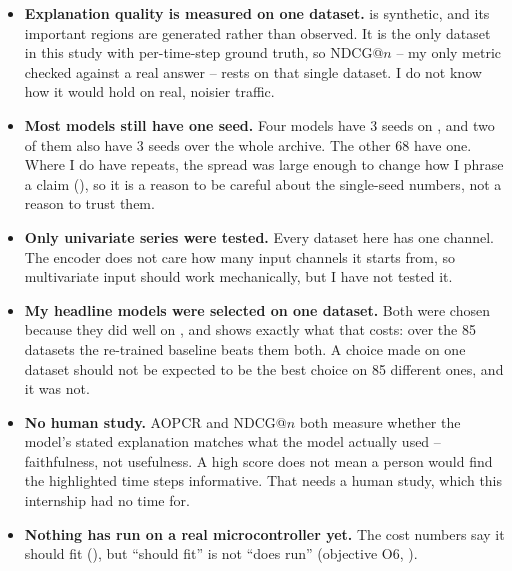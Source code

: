 \begin{itemize}\itemsep3pt
  \item \textbf{Explanation quality is measured on one dataset.} \webtraffic{} is synthetic, and
        its important regions are generated rather than observed. It is the only dataset in this
        study with per-time-step ground truth, so NDCG@$n$ -- my only metric checked against a real
        answer -- rests on that single dataset. I do not know how it would hold on real, noisier
        traffic.
  \item \textbf{Most models still have one seed.} Four models have 3 seeds on \webtraffic{}, and
        two of them also have 3 seeds over the whole \ucr{} archive. The other 68 have one. Where I
        do have repeats, the spread was large enough to change how I phrase a claim
        (), so it is a reason to be careful about the single-seed numbers,
        not a reason to trust them.
  \item \textbf{Only univariate series were tested.} Every dataset here has one channel. The
        encoder does not care how many input channels it starts from, so multivariate input should
        work mechanically, but I have not tested it.
  \item \textbf{My headline models were selected on one dataset.} Both were chosen because they did
        well on \webtraffic{}, and  shows exactly what that costs: over the 85
        \ucr{} datasets the re-trained baseline beats them both. A choice made on one dataset should
        not be expected to be the best choice on 85 different ones, and it was not.
  \item \textbf{No human study.} AOPCR and NDCG@$n$ both measure whether the model's stated
        explanation matches what the model actually used -- faithfulness, not usefulness. A high
        score does not mean a person would find the highlighted time steps informative. That needs a
        human study, which this internship had no time for.
  \item \textbf{Nothing has run on a real microcontroller yet.} The cost numbers say it should fit
        (), but ``should fit'' is not ``does run'' (objective O6,
        ).
\end{itemize}
